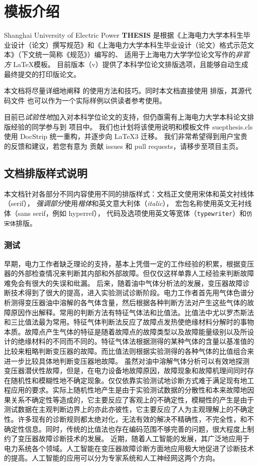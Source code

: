 \chapter{模板介绍}

Shanghai University of Electric Power \textbf{THESIS}
是根据《上海电力大学本科生毕业设计（论文）撰写规范》和《上海电力大学本科生毕业设计（论文）格式示范文本》（下文统一简称《规范》）编写的、
适用于上海电力大学学位论文写作的\emph{非官方} \LaTeX 模板。
目前版本（v\version{}）提供了本科学位论文排版选项，且能够自动生成最终提交的打印版论文。

本文档将尽量详细地阐释  的使用方法和技巧。同时本文档直接使用  排版，其源代码文件 也可以作为一个实际样例以供读者参考使用。

目前已\emph{试验性地}加入对本科学位论文的支持，但仍亟需有上海电力大学本科论文排版经验的同学参与到 项目中。
我们也计划将该使用说明和模板文件 suepthesis.cls 使用 \textsf{DocStrip} 统一重构，并逐步向 \LaTeX3 迁移。
我们非常希望得到用户宝贵的反馈和建议，若您有意为 贡献 issues 和 pull requests，请移步至项目主页。

\section{文档排版样式说明}
本文档针对各部分不同内容使用不同的排版样式：文档正文使用宋体和英文衬线体（serif），
\emph{强调部分}使用\emph{楷体}和英文意大利体（\emph{italic}），
宏包名称使用英文无衬线体（\textsf{sans serif}，例如 \textsf{hyperref}），
代码及选项使用英文等宽体（\texttt{typewriter}）和\texttt{仿宋体}排版。

\subsection{测试}

早期，电力工作者缺乏理论的支持，基本上凭借一定的工作经验的积累，根据变压器的外部检查情况来判断其内部和外部故障。但仅仅这样单靠人工经验来判断故障难免会有很大的失误和纰漏。
后来，随着油中气体分析法的发展，变压器故障诊断技术得到了很大的提高，进入实验测试诊断阶段。电力工作者首先用气体色谱分析测得变压器油中溶解的各气体含量，然后根据各种判断方法对产生这些气体的故障原因作出解释。常用的判断方法有特征气体法和比值法。比值法中尤以罗杰斯法和三比值法最为常用。特征气体判断法反应了故障点发热使绝缘材料分解时的事物本质。故障点产生气体的特征是随着故障点的故障类型以及故障能量级别以及所设计的绝缘材料的不同而不同的。特征气体法根据测得的某种气体的含量以基准值的比较来粗略判断变压器的故障。而比值法则根据实验测得的各种气体的比值组合来进一步比较具体地判断变压器地故障。
虽然对油中溶解气体分析可以有效地探测变压器潜伏性故障，但是，在电力设备地故障原因，故障现象和故障机理间同时存在随机性和模糊性地不确定现象。仅仅依靠实验测试地诊断方式难于满足现有地工程应用的要求。实际上随机性地产生是由于实验测试数据的分散性和本来故障地因果关系不确定性等造成的，它主要反应了客观上的不确定性，模糊性的产生是由于测试数据在主观判断边界上的亦此亦彼性，它主要反应了人为主观理解上的不确定性。许多现有的诊断规则都太绝对化，无法有效的解决不精确性，不完全性，和不确定性信息。同时，传统的比值法也存在编码范围不够完善的问题，很大程度上制约了变压器故障诊断技术的发展。
近期，随着人工智能的发展，其广泛地应用于电力系统各个领域。人工智能在变压器故障诊断方面地应用极大地促进了诊断技术的提高。人工智能的应用可以分为专家系统和人工神经网这两个方向。

